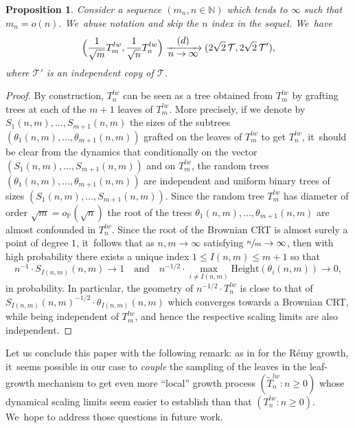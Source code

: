 \documentclass[JEP,XML,SOM,Unicode,NoFloatCountersInSection, NoEqCountersInSection,published]{cedram}
\newcommand{\N}{\mathbb{N}}
\newcommand{\T}{\mathcal{T}}\let\CRT\T\let\tbr\T
\newtheorem{prop}[thm]{Proposition}
\theoremstyle{definition}
\begin{document}
\begin{prop}\label{prop:pairedindep}
Consider a sequence $(m_n,n\in\N)$ which tends to $\infty$ such that $m_n=o(n)$. We~abuse notation and skip the $n$ index in the sequel. We~have
\[
\Bigl(\frac{1}{\sqrt{m}}T^{lw}_m,\frac{1}{\sqrt{n}}T^{lw}_n\Bigr) \xrightarrow[\textstyle n\to\infty]{\textstyle(d)} (2\sqrt{2}\,\T,2\sqrt{2}\,\T'),
\]
where $\T'$ is an independent copy of $\T$.
\end{prop}

\begin{proof} By construction, $T^{lw}_n$ can be seen as a tree obtained from $T^{lw}_m$ by grafting trees at each of the $m+1$ leaves of $T^{lw}_m$. More precisely, if we denote by $S_1(n,m),\dots , S_{m+1}(n,m)$ the sizes of the subtrees $(\theta_1(n,m), \dots , \theta_{m+1}(n,m))$ grafted on the leaves of $T^{lw}_m$ to get $T^{lw}_n$, it~should be clear from the dynamics that conditionally on the vector $(S_1(n,m), \dots , S_{m+1}(n,m))$ and on $T^{lw}_m$, the random trees $(\theta_1(n,m), \dots , \theta_{m+1}(n,m))$ are independent and uniform binary trees of sizes $(S_1(n,m), \dots , S_{m+1}(n,m))$. Since the random tree $T^{lw}_m$ has diameter of order $ \sqrt{m} = o_{\mathbb{P}}(\sqrt{n})$ the root of the trees $\theta_1(n,m), \dots , \theta_{m+1}(n,m)$ are almost confounded in $T^{lw}_n$. Since the root of the Brownian CRT is almost surely a point of degree $1$, it~follows that as $n,m \to \infty$ satisfying $ \sfrac{n}{m} \to \infty$, then with high probability there exists a unique index $1 \leq I(n,m) \leq m+1$ so that
\[
n^{-1} \cdot S_{I(n,m)}(n,m) \to 1 \quad \text{and} \quad n^{-1/2}\cdot \max_{i \ne I(n,m)} \mathrm{Height}(\theta_i(n,m)) \to 0,
\]
in probability. In particular, the geometry of $ n^{-1/2}\cdot T^{lw}_n$ is close to that of $ S_{I(n,m)}(n,m)^{-1/2}\cdot \theta_{I(n,m)}(n,m)$ which converges towards a Brownian CRT, while being independent of $T^{lw}_m$, and hence the respective scaling limits are also independent.
\end{proof}

Let us conclude this paper with the following remark: as in \cite{bacher2017efficient} for the Rémy growth, it~seems possible in our case to \textit{couple} the sampling of the leaves in the leaf-growth mechanism to get even more ``local'' growth process $(\tilde{T}_n^{lw} : n \geq 0)$ whose dynamical scaling limits seem easier to establish than that $({T}_n^{lw} : n \geq 0)$. We~hope to address those questions in future work.

\appendix
\end{document}
